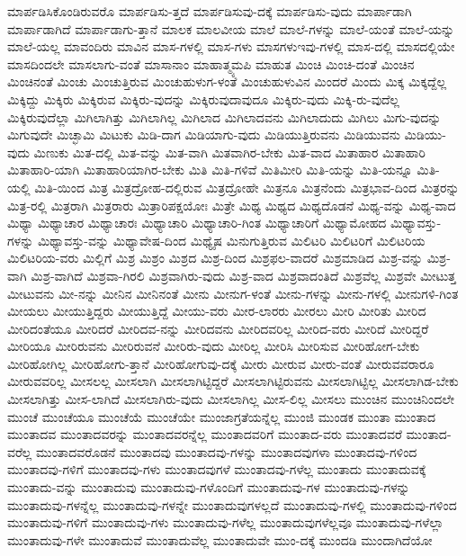 {ಮಾರ್ಪಡಿಸಿಕೊಂಡಿರುವರೊ
ಮಾರ್ಪಡಿಸು-ತ್ತದೆ
ಮಾರ್ಪಡಿಸುವು-ದಕ್ಕೆ
ಮಾರ್ಪಡಿಸು-ವುದು
ಮಾರ್ಪಾಡಾಗಿ
ಮಾರ್ಪಾಡಾಗಿದೆ
ಮಾರ್ಪಾಡಾಗು-ತ್ತಾನೆ
ಮಾಲಕ
ಮಾಲವೀಯ
ಮಾಲೆ
ಮಾಲೆ-ಗಳನ್ನು
ಮಾಲೆ-ಯಂತೆ
ಮಾಲೆ-ಯನ್ನು
ಮಾಲೆ-ಯಲ್ಲ
ಮಾವಂದಿರು
ಮಾವಿನ
ಮಾಸ-ಗಳಲ್ಲಿ
ಮಾಸ-ಗಳು
ಮಾಸಗಳುಇವು-ಗಳಲ್ಲಿ
ಮಾಸ-ದಲ್ಲಿ
ಮಾಸದಲ್ಲಿಯೇ
ಮಾಸದಿಂದಲೇ
ಮಾಸಲಾಗು-ವಂತೆ
ಮಾಸಾನಾಂ
ಮಾಹಾತ್ಮ್ಯಮಪಿ
ಮಾಹುತ
ಮಿಂಚಿ
ಮಿಂಚಿ-ದಂತೆ
ಮಿಂಚಿನ
ಮಿಂಚಿನಂತೆ
ಮಿಂಚು
ಮಿಂಚುತ್ತಿರುವ
ಮಿಂಚುಹುಳುಗ-ಳಂತೆ
ಮಿಂಚುಹುಳುವಿನ
ಮಿಂದರೆ
ಮಿಂದು
ಮಿಕ್ಕ
ಮಿಕ್ಕದ್ದೆಲ್ಲ
ಮಿಕ್ಕಿದ್ದು
ಮಿಕ್ಕಿರು
ಮಿಕ್ಕಿರುವ
ಮಿಕ್ಕಿರು-ವುದನ್ನು
ಮಿಕ್ಕಿರುವುದಾವುದೂ
ಮಿಕ್ಕಿರು-ವುದು
ಮಿಕ್ಕಿ-ರು-ವುದೆಲ್ಲ
ಮಿಕ್ಕಿರುವುದೆಲ್ಲಾ
ಮಿಗಿಲಾಗಿತ್ತು
ಮಿಗಿಲಾಗಿಲ್ಲ
ಮಿಗಿಲಾದ
ಮಿಗಿಲಾದವನು
ಮಿಗಿಲಾದುದು
ಮಿಗಿಲು
ಮಿಗು-ವುದನ್ನು
ಮಿಗುವುದೇ
ಮಿಚ್ಛಾಮಿ
ಮಿಟುಕು
ಮಿಡಿ-ದಾಗ
ಮಿಡಿಯಾಗು-ವುದು
ಮಿಡಿಯುತ್ತಿರುವನು
ಮಿಡಿಯುವನು
ಮಿಡಿಯು-ವುದು
ಮಿಣುಕು
ಮಿತ-ದಲ್ಲಿ
ಮಿತ-ವನ್ನು
ಮಿತ-ವಾಗಿ
ಮಿತವಾಗಿರ-ಬೇಕು
ಮಿತ-ವಾದ
ಮಿತಾಹಾರ
ಮಿತಾಹಾರಿ
ಮಿತಾಹಾರಿ-ಯಾಗಿ
ಮಿತಾಹಾರಿಯಾಗಿರ-ಬೇಕು
ಮಿತಿ
ಮಿತಿ-ಗಳಿವೆ
ಮಿತಿಮೀರಿ
ಮಿತಿ-ಯನ್ನು
ಮಿತಿ-ಯನ್ನೂ
ಮಿತಿ-ಯಲ್ಲಿ
ಮಿತಿ-ಯಿಂದ
ಮಿತ್ರ
ಮಿತ್ರದ್ರೋಹ-ದಲ್ಲಿರುವ
ಮಿತ್ರದ್ರೋಹೇ
ಮಿತ್ರನೂ
ಮಿತ್ರನೆಂದು
ಮಿತ್ರಭಾವ-ದಿಂದ
ಮಿತ್ರರನ್ನು
ಮಿತ್ರ-ರಲ್ಲಿ
ಮಿತ್ರರಾಗಿ
ಮಿತ್ರರಾರು
ಮಿತ್ರಾರಿಪಕ್ಷಯೋಃ
ಮಿತ್ರೇ
ಮಿಥ್ಯ
ಮಿಥ್ಯದ
ಮಿಥ್ಯದೊಡನೆ
ಮಿಥ್ಯ-ವನ್ನು
ಮಿಥ್ಯ-ವಾದ
ಮಿಥ್ಯಾ
ಮಿಥ್ಯಾಚಾರ
ಮಿಥ್ಯಾಚಾರಃ
ಮಿಥ್ಯಾಚಾರಿ
ಮಿಥ್ಯಾಚಾರಿ-ಗಿಂತ
ಮಿಥ್ಯಾಚಾರಿಗೆ
ಮಿಥ್ಯಾಮೋಹದ
ಮಿಥ್ಯಾವಸ್ತು-ಗಳನ್ನು
ಮಿಥ್ಯಾವಸ್ತು-ವನ್ನು
ಮಿಥ್ಯಾವೇಷ-ದಿಂದ
ಮಿಥ್ಯೈಷ
ಮಿನುಗುತ್ತಿರುವ
ಮಿಲಿಟರಿ
ಮಿಲಿಟರಿಗೆ
ಮಿಲಿಟರಿಯ
ಮಿಲಿಟರಿಯ-ವರು
ಮಿಲ್ಲಿಗೆ
ಮಿಶ್ರ
ಮಿಶ್ರಂ
ಮಿಶ್ರದ
ಮಿಶ್ರ-ದಿಂದ
ಮಿಶ್ರಫಲ-ವಾದರೆ
ಮಿಶ್ರಮಾಡಿದ
ಮಿಶ್ರ-ವನ್ನು
ಮಿಶ್ರ-ವಾಗಿ
ಮಿಶ್ರ-ವಾಗಿದೆ
ಮಿಶ್ರವಾ-ಗಿರಲಿ
ಮಿಶ್ರವಾಗಿರು-ವುದು
ಮಿಶ್ರ-ವಾದ
ಮಿಶ್ರವಾದಂತಿದೆ
ಮಿಶ್ರವೆಲ್ಲ
ಮಿಶ್ರವೇ
ಮೀಟುತ್ತ
ಮೀಟುವನು
ಮೀ-ನನ್ನು
ಮೀನಿನ
ಮೀನಿನಂತೆ
ಮೀನು
ಮೀನುಗ-ಳಂತೆ
ಮೀನು-ಗಳನ್ನು
ಮೀನು-ಗಳಲ್ಲಿ
ಮೀನುಗಳಿ-ಗಿಂತ
ಮೀಯಲು
ಮೀಯುತ್ತಿದ್ದರು
ಮೀಯುತ್ತಿದ್ದೆ
ಮೀಯು-ವರು
ಮೀರ-ಲಾರರು
ಮೀರಲು
ಮೀರಿ
ಮೀರಿತು
ಮೀರಿದ
ಮೀರಿದಂತೆಯೂ
ಮೀರಿದರೆ
ಮೀರಿದವ-ನನ್ನು
ಮೀರಿದವನು
ಮೀರಿದವರಿಲ್ಲ
ಮೀರಿದ-ವರು
ಮೀರಿದೆ
ಮೀರಿದ್ದರೆ
ಮೀರಿಯೂ
ಮೀರಿರುವನು
ಮೀರಿರುವನೆ
ಮೀರಿರು-ವುದು
ಮೀರಿಲ್ಲ
ಮೀರಿಸಿ
ಮೀರಿಸುವ
ಮೀರಿಹೋಗ-ಬೇಕು
ಮೀರಿಹೋಗಿಲ್ಲ
ಮೀರಿಹೋಗು-ತ್ತಾನೆ
ಮೀರಿಹೋಗುವು-ದಕ್ಕೆ
ಮೀರು
ಮೀರುವ
ಮೀರು-ವಂತೆ
ಮೀರುವವರಾರೂ
ಮೀರುವವರಿಲ್ಲ
ಮೀಸಲಲ್ಲ
ಮೀಸಲಾಗಿ
ಮೀಸಲಾಗಿಟ್ಟಿದ್ದರೆ
ಮೀಸಲಾಗಿಟ್ಟಿರುವನು
ಮೀಸಲಾಗಿಟ್ಟಿಲ್ಲ
ಮೀಸಲಾಗಿಡ-ಬೇಕು
ಮೀಸಲಾಗಿತ್ತು
ಮೀಸ-ಲಾಗಿದೆ
ಮೀಸಲಾಗಿರು-ವುದು
ಮೀಸಲಾಗಿಲ್ಲ
ಮೀಸ-ಲಿಲ್ಲ
ಮೀಸಲು
ಮುಂಚಿನ
ಮುಂಚಿನಿಂದಲೇ
ಮುಂಚೆ
ಮುಂಚೆಯೂ
ಮುಂಚೆಯೆ
ಮುಂಚೆಯೇ
ಮುಂಜಾಗ್ರತೆಯನ್ನೆಲ್ಲ
ಮುಂಜಿ
ಮುಂಡಕ
ಮುಂತಾ
ಮುಂತಾದ
ಮುಂತಾದವ
ಮುಂತಾದವರನ್ನು
ಮುಂತಾದವರನ್ನೆಲ್ಲ
ಮುಂತಾದವರಿಗೆ
ಮುಂತಾದ-ವರು
ಮುಂತಾದವರೆ
ಮುಂತಾದ-ವರೆಲ್ಲ
ಮುಂತಾದವರೊಡನೆ
ಮುಂತಾದವು
ಮುಂತಾದವು-ಗಳನ್ನು
ಮುಂತಾದವುಗಳಾ
ಮುಂತಾದವು-ಗಳಿಂದ
ಮುಂತಾದವು-ಗಳಿಗೆ
ಮುಂತಾದವು-ಗಳು
ಮುಂತಾದವುಗಳೆ
ಮುಂತಾದವು-ಗಳೆಲ್ಲ
ಮುಂತಾದು
ಮುಂತಾದುವಕ್ಕೆ
ಮುಂತಾದು-ವನ್ನು
ಮುಂತಾದುವು
ಮುಂತಾದುವು-ಗಳೊಂದಿಗೆ
ಮುಂತಾದುವು-ಗಳ
ಮುಂತಾದುವು-ಗಳನ್ನು
ಮುಂತಾದುವು-ಗಳನ್ನೆಲ್ಲ
ಮುಂತಾದುವು-ಗಳನ್ನೇ
ಮುಂತಾದುವುಗಳಲ್ಲದೆ
ಮುಂತಾದುವು-ಗಳಲ್ಲಿ
ಮುಂತಾದುವು-ಗಳಿಂದ
ಮುಂತಾದುವು-ಗಳಿಗೆ
ಮುಂತಾದುವು-ಗಳು
ಮುಂತಾದುವು-ಗಳೆಲ್ಲ
ಮುಂತಾದುವುಗಳೆಲ್ಲವೂ
ಮುಂತಾದುವು-ಗಳೆಲ್ಲಾ
ಮುಂತಾದುವು-ಗಳೇ
ಮುಂತಾದುವೆ
ಮುಂತಾದುವೆಲ್ಲ
ಮುಂತಾದುವೇ
ಮುಂ-ದಕ್ಕೆ
ಮುಂದಡಿ
ಮುಂದಾಗಿದೆಯೋ
}
